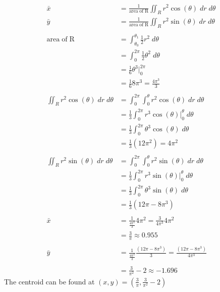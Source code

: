 \documentclass[a4paper,11pt]{article}
\begin{document}
\begin{preview}
\begin{enumerate}
\begin{enumerate}
    \begin{align*}
        \bar{x} &= \frac{1}{\mathrm{area \; of \; R}} \iint_{R}r^2\cos(\theta) \; dr\; d\theta\\
        \bar{y} &= \frac{1}{\mathrm{area \; of \; R}} \iint_{R}r^2\sin(\theta) \; dr\; d\theta\\\\
        \mathrm{area \; of \; R} &= \int_{\theta_0}^{\theta_1}\frac{1}{2}r^2 \; d \theta\\
        &= \int_{0}^{2\pi}\frac{1}{2} \theta^2 \; d \theta\\
        &= \frac{1}{6} \theta^3 \Big|_{0}^{2\pi}\\
        &= \frac{1}{6} 8\pi^3 = \frac{4\pi^3}{3}\\\\
        \iint_{R}r^2\cos(\theta) \; dr\; d\theta &= \int_{0}^{2\pi}\int_{0}^{\theta} r^2\cos(\theta) \; dr\; d\theta\\
        &= \frac{1}{3} \int_{0}^{2\pi} r^3\cos(\theta)\Big|_{0}^{\theta} \; d\theta \\
        &= \frac{1}{3} \int_{0}^{2\pi} \theta^3\cos(\theta) \; d\theta \\
        &= \frac{1}{3}(12\pi^2) = 4\pi^2\\\\
        \iint_{R}r^2\sin(\theta) \; dr\; d\theta &= \int_{0}^{2\pi}\int_{0}^{\theta} r^2\sin(\theta) \; dr\; d\theta\\
        &= \frac{1}{3} \int_{0}^{2\pi} r^3\sin(\theta)\Big|_{0}^{\theta} \; d\theta \\
        &= \frac{1}{3} \int_{0}^{2\pi} \theta^3\sin(\theta) \; d\theta \\
        &= \frac{1}{3}(12\pi - 8\pi^3)\\\\
        \bar{x} &= \frac{1}{\frac{4\pi^3}{3}}4\pi^2 = \frac{3}{4\pi^3}4\pi^2 \\
        &= \frac{3}{\pi} \approx 0.955\\\\
        \bar{y} &= \frac{1}{\frac{4\pi^3}{3}}\frac{(12\pi - 8\pi^3)}{3} = \frac{(12\pi - 8\pi^3)}{4\pi^3}\\\\
        &= \frac{3}{\pi^2}-2 \approx -1.696
    \end{align*}
    The centroid can be found at $(x,y)=(\frac{3}{\pi}, \frac{3}{\pi^2}-2)$\\

\end{enumerate}


\end{enumerate}
\end{preview}
\end{document}
